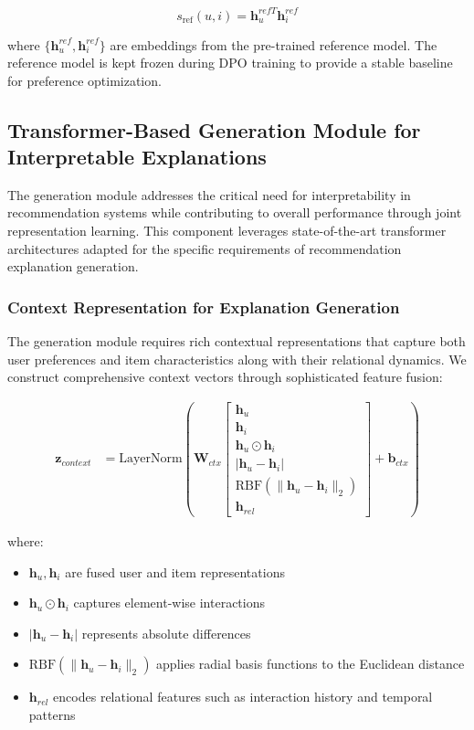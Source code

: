 \documentclass[pdflatex,sn-mathphys-num]{sn-jnl}%
\theoremstyle{thmstyleone}%
\theoremstyle{thmstyletwo}%
\theoremstyle{thmstylethree}%
\begin{document}
\begin{equation}
s_{\text{ref}}(u, i) = \mathbf{h}_u^{ref T} \mathbf{h}_i^{ref}
\end{equation}

where $\{\mathbf{h}_u^{ref}, \mathbf{h}_i^{ref}\}$ are embeddings from the pre-trained reference model. The reference model is kept frozen during DPO training to provide a stable baseline for preference optimization.

\subsection{Transformer-Based Generation Module for Interpretable Explanations}\label{subsec:generation}

The generation module addresses the critical need for interpretability in recommendation systems \cite{zhang2020explainable,herlocker2000explaining} while contributing to overall performance through joint representation learning. This component leverages state-of-the-art transformer architectures adapted for the specific requirements of recommendation explanation generation.

\subsubsection{Context Representation for Explanation Generation}

The generation module requires rich contextual representations that capture both user preferences and item characteristics along with their relational dynamics. We construct comprehensive context vectors through sophisticated feature fusion:

\begin{align}
\mathbf{z}_{context} &= \text{LayerNorm}\left(\mathbf{W}_{ctx} \left[\begin{array}{c} 
\mathbf{h}_u \\ 
\mathbf{h}_i \\ 
\mathbf{h}_u \odot \mathbf{h}_i \\ 
|\mathbf{h}_u - \mathbf{h}_i| \\
\text{RBF}(\|\mathbf{h}_u - \mathbf{h}_i\|_2) \\
\mathbf{h}_{rel}
\end{array}\right] + \mathbf{b}_{ctx}\right)
\end{align}

where:
\begin{itemize}
\item $\mathbf{h}_u, \mathbf{h}_i$ are fused user and item representations
\item $\mathbf{h}_u \odot \mathbf{h}_i$ captures element-wise interactions
\item $|\mathbf{h}_u - \mathbf{h}_i|$ represents absolute differences
\item $\text{RBF}(\|\mathbf{h}_u - \mathbf{h}_i\|_2)$ applies radial basis functions to the Euclidean distance
\item $\mathbf{h}_{rel}$ encodes relational features such as interaction history and temporal patterns
\end{itemize}
\end{document}

